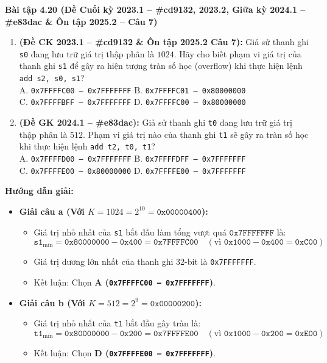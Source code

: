 \textbf{Bài tập 4.20 (Đề Cuối kỳ 2023.1 -- \#cd9132, 2023.2, Giữa kỳ 2024.1 -- \#e83dac \& Ôn tập 2025.2 -- Câu 7)}
\begin{enumerate}[label=\alph*)]
    \item \textbf{(Đề CK 2023.1 -- \#cd9132 \& Ôn tập 2025.2 Câu 7):} Giả sử thanh ghi \texttt{s0} đang lưu trữ giá trị thập phân là $1024$. Hãy cho biết phạm vi giá trị của thanh ghi \texttt{s1} để gây ra hiện tượng tràn số học (overflow) khi thực hiện lệnh \texttt{add s2, s0, s1}?\\
    A. \texttt{0x7FFFFC00 -- 0x7FFFFFFF} \qquad B. \texttt{0x7FFFFC01 -- 0x80000000}\\
    C. \texttt{0x7FFFFBFF -- 0x7FFFFFFF} \qquad D. \texttt{0x7FFFFC00 -- 0x80000000}
    \item \textbf{(Đề GK 2024.1 -- \#e83dac):} Giả sử thanh ghi \texttt{t0} đang lưu trữ giá trị thập phân là $512$. Phạm vi giá trị nào của thanh ghi \texttt{t1} sẽ gây ra tràn số học khi thực hiện lệnh \texttt{add t2, t0, t1}?\\
    A. \texttt{0x7FFFFD00 -- 0x7FFFFFFF} \qquad B. \texttt{0x7FFFFDFF -- 0x7FFFFFFF}\\
    C. \texttt{0x7FFFFE00 -- 0x80000000} \qquad D. \texttt{0x7FFFFE00 -- 0x7FFFFFFF}
\end{enumerate}
\textbf{Hướng dẫn giải:}
\begin{itemize}
    \item \textbf{Giải câu a (Với $K = 1024 = 2^{10} = \texttt{0x00000400}$):}
    \begin{itemize}
        \item Giá trị nhỏ nhất của \texttt{s1} bắt đầu làm tổng vượt quá $\texttt{0x7FFFFFFF}$ là:
        $$\texttt{s1}_{\min} = \texttt{0x80000000} - \texttt{0x400} = \texttt{0x7FFFFC00}\quad (\text{vì }\texttt{0x1000} - \texttt{0x400} = \texttt{0xC00})$$
        \item Giá trị dương lớn nhất của thanh ghi 32-bit là \texttt{0x7FFFFFFF}.
        \item Kết luận: Chọn \textbf{A (\texttt{0x7FFFFC00 -- 0x7FFFFFFF})}.
    \end{itemize}
    \item \textbf{Giải câu b (Với $K = 512 = 2^9 = \texttt{0x00000200}$):}
    \begin{itemize}
        \item Giá trị nhỏ nhất của \texttt{t1} bắt đầu gây tràn là:
        $$\texttt{t1}_{\min} = \texttt{0x80000000} - \texttt{0x200} = \texttt{0x7FFFFE00}\quad (\text{vì }\texttt{0x1000} - \texttt{0x200} = \texttt{0xE00})$$
        \item Kết luận: Chọn \textbf{D (\texttt{0x7FFFFE00 -- 0x7FFFFFFF})}.
    \end{itemize}
\end{itemize}

